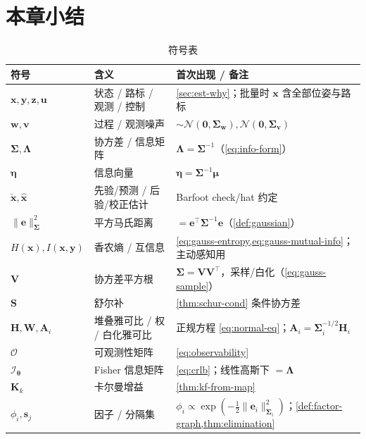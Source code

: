 \section*{本章小结}

\begin{table}[H]\centering\small
\caption{符号表}
\begin{tabular}{lll}
\toprule
符号 & 含义 & 首次出现 / 备注 \\
\midrule
$\mathbf{x},\mathbf{y},\mathbf{z},\mathbf{u}$ & 状态 / 路标 / 观测 / 控制 & \cref{sec:est-why}；批量时 $\mathbf{x}$ 含全部位姿与路标 \\
$\mathbf{w},\mathbf{v}$ & 过程 / 观测噪声 & $\sim\mathcal{N}(\mathbf{0},\boldsymbol{\Sigma}_{\mathbf{w}}),\mathcal{N}(\mathbf{0},\boldsymbol{\Sigma}_{\mathbf{v}})$ \\
$\boldsymbol{\Sigma},\boldsymbol{\Lambda}$ & 协方差 / 信息矩阵 & $\boldsymbol{\Lambda}=\boldsymbol{\Sigma}^{-1}$（\cref{eq:info-form}） \\
$\boldsymbol{\eta}$ & 信息向量 & $\boldsymbol{\eta}=\boldsymbol{\Sigma}^{-1}\boldsymbol{\mu}$ \\
$\check{\mathbf{x}},\hat{\mathbf{x}}$ & 先验/预测 / 后验/校正估计 & Barfoot check/hat 约定 \\
$\|\mathbf{e}\|_{\boldsymbol{\Sigma}}^2$ & 平方马氏距离 & $=\mathbf{e}^\top\boldsymbol{\Sigma}^{-1}\mathbf{e}$（\cref{def:gaussian}） \\
$H(\mathbf{x}),I(\mathbf{x},\mathbf{y})$ & 香农熵 / 互信息 & \cref{eq:gauss-entropy,eq:gauss-mutual-info}；主动感知用 \\
$\mathbf{V}$ & 协方差平方根 & $\boldsymbol{\Sigma}=\mathbf{V}\mathbf{V}^\top$，采样/白化（\cref{eq:gauss-sample}） \\
$\mathbf{S}$ & 舒尔补 & \cref{thm:schur-cond} 条件协方差 \\
$\mathbf{H},\mathbf{W},\mathbf{A}_i$ & 堆叠雅可比 / 权 / 白化雅可比 & 正规方程 \cref{eq:normal-eq}；$\mathbf{A}_i=\boldsymbol{\Sigma}_i^{-1/2}\mathbf{H}_i$ \\
$\mathcal{O}$ & 可观测性矩阵 & \cref{eq:observability} \\
$\boldsymbol{\mathcal{I}}_{\boldsymbol{\theta}}$ & Fisher 信息矩阵 & \cref{eq:crlb}；线性高斯下 $=\boldsymbol{\Lambda}$ \\
$\mathbf{K}_k$ & 卡尔曼增益 & \cref{thm:kf-from-map} \\
$\phi_i,\mathbf{s}_j$ & 因子 / 分隔集 & $\phi_i\propto\exp(-\tfrac12\|\mathbf{e}_i\|_{\boldsymbol{\Sigma}_i}^2)$；\cref{def:factor-graph,thm:elimination} \\

\end{tabular}
\end{table}

